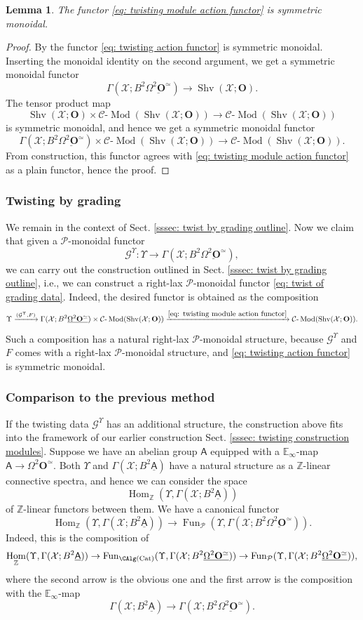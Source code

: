 \documentclass[10pt]{amsart}
\newcommand{\sssec}{\subsubsection}
\newtheorem{lemma}[subsubsection]{Lemma}
\theoremstyle{remark}
\newcommand{\ul}{\underline}
\newcommand{\E}{\mathbb{E}}
\newcommand{\Z}{\mathbb{Z}}
\newcommand{\cP}{\mathcal{P}}
\newcommand{\on}{\operatorname}
\newcommand{\cC}{\mathcal{C}}
\newcommand{\cG}{\mathcal{G}}
\newcommand{\cX}{\mathcal{X}}
\newcommand{\Cat}{\on{Cat}}
\newcommand{\lMod}{\text{-}\on{Mod}}
\newcommand{\Shv}{\on{Shv}}
\DeclareMathOperator{\Hom}{Hom}
\newcommand{\Fun}{\on{Fun}}
\newcommand{\bO}{\mathbf{O}}
\newcommand{\sfA}{\mathsf{A}}
\begin{document}
\begin{lemma}
    The functor \eqref{eq: twisting module action functor} is symmetric monoidal.
\end{lemma}
\begin{proof}
    By \cite[Lemma A.2.2]{ZhaoNew} the functor \eqref{eq: twisting action functor} is symmetric monoidal. Inserting the monoidal identity on the second argument, we get a symmetric monoidal functor
    \[\Gamma(\cX;B^2\ul{\Omega^2\bO^{\simeq}})\rightarrow\Shv(\cX;\bO).\]
    The tensor product map
    \[\Shv(\cX;\bO)\times\cC\lMod(\Shv(\cX;\bO))\rightarrow \cC\lMod(\Shv(\cX;\bO))\]
    is symmetric monoidal, and hence we get a symmetric monoidal functor
    \[\Gamma(\cX;B^2\ul{\Omega^2\bO^{\simeq}})\times\cC\lMod(\Shv(\cX;\bO))\rightarrow \cC\lMod(\Shv(\cX;\bO)).\]
    From construction, this functor agrees with \eqref{eq: twisting module action functor} as a plain functor, hence the proof.
\end{proof}

\sssec{Twisting by grading}\label{sssec: twist by grading}
We remain in the context of Sect. \ref{sssec: twist by grading outline}. Now we claim that given a $\cP$-monoidal functor
\[\cG^{\Upsilon}:\Upsilon\rightarrow \Gamma(\cX;B^2\ul{\Omega^2\bO^{\simeq}}),\]
we can carry out the construction outlined in Sect. \ref{sssec: twist by grading outline}, i.e., we can construct a right-lax $\cP$-monoidal functor \eqref{eq: twist of grading data}. Indeed, the desired functor is obtained as the composition
\[\Upsilon\xrightarrow{(\cG^{\Upsilon}, F)}\Gamma(\cX;B^2\ul{\Omega^2\bO^{\simeq}})\times \cC\lMod(\Shv(\cX;\bO))\xrightarrow{\eqref{eq: twisting module action functor}}\cC\lMod(\Shv(\cX;\bO)).\]
Such a composition has a natural right-lax $\cP$-monoidal structure, because $\cG^{\Upsilon}$ and $F$ comes with a right-lax $\cP$-monoidal structure, and \eqref{eq: twisting action functor} is symmetric monoidal.

\sssec{Comparison to the previous method}\label{sssec: comparison of twisting methods}
If the twisting data $\cG^{\Upsilon}$ has an additional structure, the construction above fits into the framework of our earlier construction Sect. \ref{sssec: twisting construction modules}. Suppose we have an abelian group $\sfA$ equipped with a $\E_{\infty}$-map $\sfA\rightarrow \Omega^2\bO^{\simeq}$. Both $\Upsilon$ and $\Gamma(\cX; B^2\ul{\sfA})$ have a natural structure as a $\Z$-linear connective spectra, and hence we can consider the space
\[\Hom_{\Z}(\Upsilon,\Gamma(\cX;B^2\ul{\sfA}))\]
of $\Z$-linear functors between them. We have a canonical functor
\begin{equation}\label{eq: Hom Z to Fun rlax P}
    \Hom_{\Z}(\Upsilon,\Gamma(\cX;B^2\ul{\sfA}))\rightarrow \Fun_{\cP}(\Upsilon, \Gamma(\cX;B^2\ul{\Omega^2\bO^{\simeq}})).
\end{equation}
 Indeed,
this is the composition of
\[\Hom_{\Z}(\Upsilon,\Gamma(\cX;B^2\ul{\sfA}))\rightarrow \Fun_{\CAlg(\Cat)}(\Upsilon, \Gamma(\cX;B^2\ul{\Omega^2\bO^{\simeq}}))\rightarrow \Fun_{\cP}(\Upsilon, \Gamma(\cX;B^2\ul{\Omega^2\bO^{\simeq}})),\]
where the second arrow is the obvious one and the first arrow is the composition with the $\E_{\infty}$-map
\[\Gamma(\cX;B^2\ul{\sfA})\rightarrow\Gamma(\cX;B^2\ul{\Omega^2\bO^{\simeq}}).\]
\end{document}
